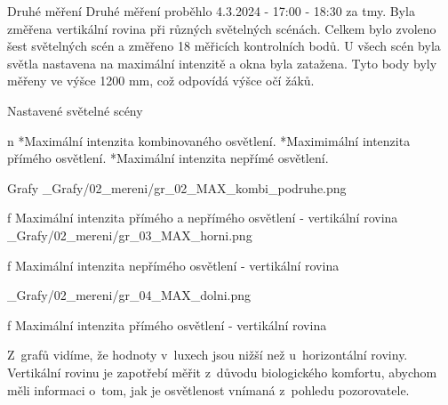 \sec Druhé měření
Druhé měření proběhlo 4.3.2024 - 17:00 - 18:30 za tmy. Byla změřena vertikální rovina při různých světelných scénách.
Celkem bylo zvoleno šest světelných scén a změřeno 18 měřicích kontrolních bodů. U všech scén byla světla nastavena na maximální intenzitě a okna byla zatažena.
Tyto body byly měřeny ve výšce 1200 mm, což odpovídá výšce očí žáků.
\medskip

{\sbf Nastavené světelné scény}

\begitems \style n
    *Maximální intenzita kombinovaného osvětlení.
    *Maximimální intenzita přímého osvětlení.
    *Maximální intenzita nepřímé osvětlení.
\enditems

\secc Grafy
\medskip {}
\picw=15cm _Grafy/02_mereni/gr_02_MAX_kombi_podruhe.png
\caption/f Maximální intenzita přímého a nepřímého osvětlení - vertikální rovina
\medskip {}
\picw=15cm _Grafy/02_mereni/gr_03_MAX_horni.png
\caption/f Maximální intenzita nepřímého osvětlení - vertikální rovina

\medskip {}
\picw=15cm _Grafy/02_mereni/gr_04_MAX_dolni.png
\caption/f Maximální intenzita přímého osvětlení - vertikální rovina
\medskip

Z~grafů vidíme, že hodnoty v~luxech jsou nižší než u~horizontální roviny. Vertikální rovinu je zapotřebí měřit z~důvodu biologického komfortu, abychom měli informaci o~tom, jak je osvětlenost vnímaná z~pohledu pozorovatele.



